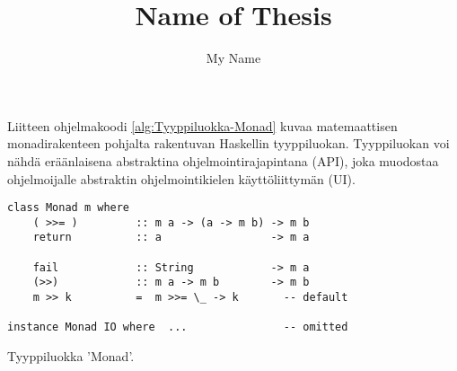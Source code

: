 \documentclass[language=finnish,version=final,mainfont=none,sharelatex=false]{utuftthesis}
\providecommand{\algorithmname}{Algoritmi}
\begin{document}
\title{Name of Thesis}
\author{My Name}

\maketitle


\tableofcontents

\listoffigures

\listoftables

\listofacronyms

\renewcommand{\algorithmname}{\listingscaption}


\begin{comment}
To better organize things, create a new tex file for each chapter
and input it below.

Avoid using the å, ä, ö or <space> characters in referred names and
underscores \_ in file names (may break hyperref).

Good luck!
\end{comment}



%
%


\printbibliography

\begin{comment}
Important! Create the appendix chapters with command \textbackslash appchapter\{some
name\} instead of \textbackslash chapter\{some name\} for the automagic
page counting to work!
\end{comment}



Liitteen ohjelmakoodi \ref{alg:Tyyppiluokka-Monad} kuvaa matemaattisen
monadirakenteen pohjalta rakentuvan Haskellin tyyppiluokan. Tyyppiluokan
voi nähdä eräänlaisena abstraktina ohjelmointirajapintana (API),
joka muodostaa ohjelmoijalle abstraktin ohjelmointikielen käyttöliittymän
(UI).

\begin{algorithm}[tbh]
\begin{verbatim}
class Monad m where
    ( >>= )         :: m a -> (a -> m b) -> m b
    return          :: a                 -> m a

    fail            :: String            -> m a
    (>>)            :: m a -> m b        -> m b
    m >> k          =  m >>= \_ -> k       -- default

instance Monad IO where  ...               -- omitted
\end{verbatim}

\caption{Tyyppiluokka 'Monad'.\label{alg:Tyyppiluokka-Monad}}
\end{algorithm}
\end{document}
